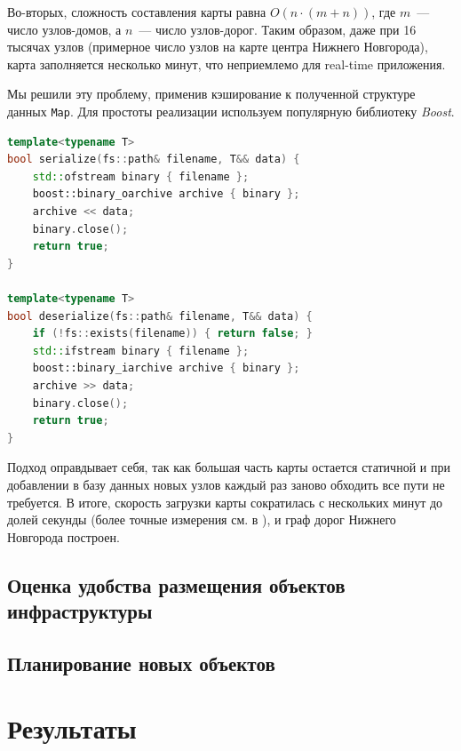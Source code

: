 \documentclass[11pt]{article}
\begin{document}
	Во-вторых, сложность составления карты равна $ O(n \cdot (m + n)) $, где $ m $~--- число узлов-домов, а $ n $~--- число узлов-дорог.
	Таким образом, даже при 16 тысячах узлов (примерное число узлов на карте центра Нижнего Новгорода), карта заполняется несколько минут, что неприемлемо для real-time приложения.
	
	Мы решили эту проблему, применив кэширование к полученной структуре данных \texttt{Map}.
	Для простоты реализации используем популярную библиотеку \textit{Boost}.
	
	\begin{lstlisting}[language=C++]
template<typename T>
bool serialize(fs::path& filename, T&& data) {
	std::ofstream binary { filename };
	boost::binary_oarchive archive { binary };
	archive << data;
	binary.close();
	return true;
}

template<typename T>
bool deserialize(fs::path& filename, T&& data) {
	if (!fs::exists(filename)) { return false; }
	std::ifstream binary { filename };
	boost::binary_iarchive archive { binary };
	archive >> data;
	binary.close();
	return true;
}
	\end{lstlisting}
	
	Подход оправдывает себя, так как большая часть карты остается статичной и при добавлении в базу данных новых узлов каждый раз заново обходить все пути не требуется.
	В итоге, скорость загрузки карты сократилась с нескольких минут до долей секунды (более точные измерения см. в ), и граф дорог Нижнего Новгорода построен.
	
    \subsection{Оценка удобства размещения объектов инфраструктуры}
    
    \subsection{Планирование новых объектов}
    
    \section{Результаты}\label{section:results}
	
	\pagebreak
\end{document}
